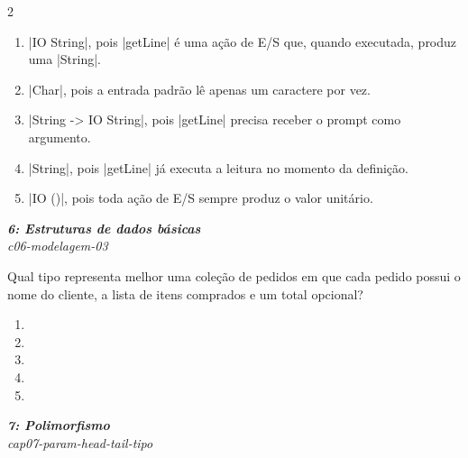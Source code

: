 \documentclass[a4paper,10pt,brazil]{article}
\begin{document}
\begin{multicols}{2}
\begin{enumerate}
  \item \haskellinline|IO String|, pois \haskellinline|getLine| é uma ação de E/S que, quando executada, produz uma \haskellinline|String|.

  \item \haskellinline|Char|, pois a entrada padrão lê apenas um caractere por vez.

  \item \haskellinline|String -> IO String|, pois \haskellinline|getLine| precisa receber o prompt como argumento.

  \item \haskellinline|String|, pois \haskellinline|getLine| já executa a leitura no momento da definição.

  \item \haskellinline|IO ()|, pois toda ação de E/S sempre produz o valor unitário.


\end{enumerate}

\begin{flushright}
  \footnotesize
  \textit{\textbf{6: Estruturas de dados básicas}}\\
  \textit{c06-modelagem-03}\\

\end{flushright}
Qual tipo representa melhor uma coleção de pedidos em que cada pedido possui o nome do cliente, a lista de itens comprados e um total opcional?

\begin{enumerate}
  \item {}

  \item {}

  \item \haskellinline{([String], [Int], [Double])}

  \item {}

  \item {}


\end{enumerate}

\begin{flushright}
  \footnotesize
  \textit{\textbf{7: Polimorfismo}}\\
  \textit{cap07-param-head-tail-tipo}\\


\end{flushright}
\end{multicols}
\end{document}
